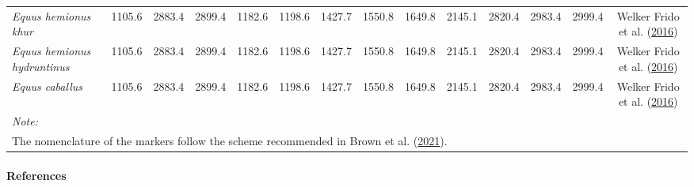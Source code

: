 \documentclass[
]{article}
\begin{document}
\begin{landscape}
\begin{table}
{\begin{tabular}[t]{>{}lccccccccccccc}
\em{Equus hemionus khur} & 1105.6 & 2883.4 & 2899.4 & 1182.6 & 1198.6 & 1427.7 & 1550.8 & 1649.8 & 2145.1 & 2820.4 & 2983.4 & 2999.4 & Welker Frido et al. (\protect\hyperlink{ref-welkerfrido_etal16}{2016})\\
\em{Equus hemionus hydruntinus} & 1105.6 & 2883.4 & 2899.4 & 1182.6 & 1198.6 & 1427.7 & 1550.8 & 1649.8 & 2145.1 & 2820.4 & 2983.4 & 2999.4 & Welker Frido et al. (\protect\hyperlink{ref-welkerfrido_etal16}{2016})\\
\em{Equus caballus} & 1105.6 & 2883.4 & 2899.4 & 1182.6 & 1198.6 & 1427.7 & 1550.8 & 1649.8 & 2145.1 & 2820.4 & 2983.4 & 2999.4 & Welker Frido et al. (\protect\hyperlink{ref-welkerfrido_etal16}{2016})\\
\bottomrule
\multicolumn{14}{l}{\rule{0pt}{1em}\textit{Note: }}\\
\multicolumn{14}{l}{\rule{0pt}{1em}The nomenclature of the markers follow the scheme recommended in Brown et al. (\protect\hyperlink{ref-brown_etal21}{2021}).}\\
\end{tabular}}
\end{table}
\end{landscape}

\hypertarget{references}{%
\paragraph*{References}\label{references}}

\hfill\break





\begin{table}

\caption{\label{tab:si3tablep1} Number of proteins in proteome search and coverage of collagen for confirmation search digested with chymotrypsin.}
\end{table}
\end{document}
